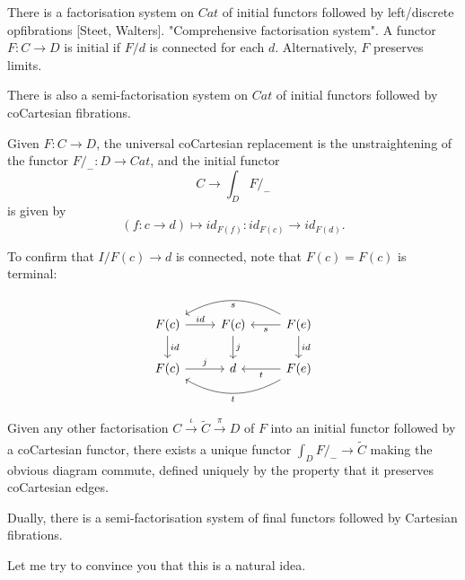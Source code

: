 \begin{example}
    There is a factorisation 
    system on $Cat$ of initial functors followed by left/discrete opfibrations [Steet, Walters]. "Comprehensive factorisation system".
    A functor $F:C\rightarrow D$ is initial if $F/d$ is connected for each $d.$ Alternatively, $F$ preserves limits.
    
    There is also a semi-factorisation system on $Cat$ of initial functors followed by coCartesian fibrations.

    Given $F:C\rightarrow D$, the universal coCartesian replacement is the unstraightening of the functor $F/_-:D\rightarrow Cat$, and the initial functor $$C\rightarrow \int_D F/_-$$ is given by $$(f:c\rightarrow d)\mapsto id_{F(f)}:id_{F(c)}\rightarrow id_{F(d)}.$$


   To confirm that $I/{F(c)\rightarrow d}$ is connected, note that $F(c)=F(c)$ is terminal:

\[\begin{tikzcd}
F(c) \arrow[d, "id"] \arrow[r, "id"] & F(c) \arrow[d, "j"] & F(e) \arrow[l, "s"] \arrow[ll, "s", bend right] \arrow[d, "id"] \\
F(c) \arrow[r, "j"]                  & d                   & F(e) \arrow[l, "t"] \arrow[ll, "t", bend left]                 
\end{tikzcd}\]
    
    Given any other factorisation $C\xrightarrow[]{\iota}\tilde{C}\xrightarrow[]{\pi} D$ of $F$ into an initial functor followed by a coCartesian functor, there exists a unique functor $\int_D F/_-\rightarrow \tilde{C}$ making the obvious diagram commute, defined uniquely by the property that it preserves coCartesian edges.


    Dually, there is a semi-factorisation system of final functors followed by Cartesian fibrations.
\end{example}

Let me try to convince you that this is a natural idea.
